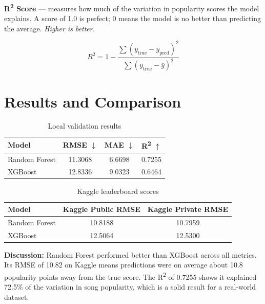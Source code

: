 \documentclass[12pt, a4paper]{article}
\begin{document}
\textbf{R\textsuperscript{2} Score} — measures how much of the variation in popularity scores the model explains. A score of 1.0 is perfect; 0 means the model is no better than predicting the average. \textit{Higher is better.}

\begin{equation*}
    R^2 = 1 - \frac{\sum(y_{\text{true}} - y_{\text{pred}})^2}{\sum(y_{\text{true}} - \bar{y})^2}
\end{equation*}

\section*{Results and Comparison}

\begin{table}[H]
    \centering
    \begin{tabular}{lccc}
        \toprule
        \textbf{Model} & \textbf{RMSE} $\downarrow$ & \textbf{MAE} $\downarrow$ & \textbf{R\textsuperscript{2}} $\uparrow$ \\
        \midrule
        Random Forest & 11.3068 & 6.6698 & 0.7255 \\
        XGBoost       & 12.8336 & 9.0323 & 0.6464 \\
        \bottomrule
    \end{tabular}
    \caption{Local validation results}
\end{table}

\begin{table}[H]
    \centering
    \begin{tabular}{lcc}
        \toprule
        \textbf{Model} & \textbf{Kaggle Public RMSE} & \textbf{Kaggle Private RMSE} \\
        \midrule
        Random Forest & 10.8188 & 10.7959 \\
        XGBoost       & 12.5064 & 12.5300 \\
        \bottomrule
    \end{tabular}
    \caption{Kaggle leaderboard scores}
\end{table}

\textbf{Discussion:} Random Forest performed better than XGBoost across all metrics. Its RMSE of 10.82 on Kaggle means predictions were on average about 10.8 popularity points away from the true score. The R\textsuperscript{2} of 0.7255 shows it explained 72.5\% of the variation in song popularity, which is a solid result for a real-world dataset.
\end{document}
